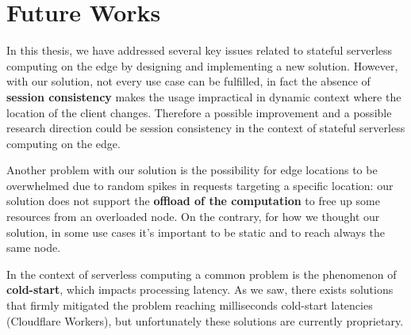 \section{Future Works}
In this thesis, we have addressed several key issues related to stateful serverless computing on the edge by designing and implementing a new solution. However, with our solution, not every use case can be fulfilled, in fact the absence of \textbf{session consistency} makes the usage impractical in dynamic context where the location of the client changes.
Therefore a possible improvement and a possible research direction could be session consistency in the context of stateful serverless computing on the edge.

Another problem with our solution is the possibility for edge locations to be overwhelmed due to random spikes in requests targeting a specific location: our solution does not support the \textbf{offload of the computation} to free up some resources from an overloaded node. On the contrary, for how we thought our solution, in some use cases it's important to be static and to reach always the same node. 

In the context of serverless computing a common problem is the phenomenon of \textbf{cold-start}, which impacts processing latency. As we saw, there exists solutions that firmly mitigated the problem reaching milliseconds cold-start latencies (Cloudflare Workers), but unfortunately these solutions are currently proprietary.



\iffalse
In this chapter, you present the conclusions of your thesis and a couple of possible future works to extend your results. First of all, you should briefly repeat the problem you addressed in the thesis. Then, you report your achievements and how they improve the state of the art.

\section{Conclusions}
In this thesis, we analyzed the problem of ... . We proposed a new approach that ... . We tested this method on ... . Reported results show that our proposal outperforms the state of the art method.

\section{Future works}
There are several appealing paths for future works. A possible extension could be to ... .
\fi
